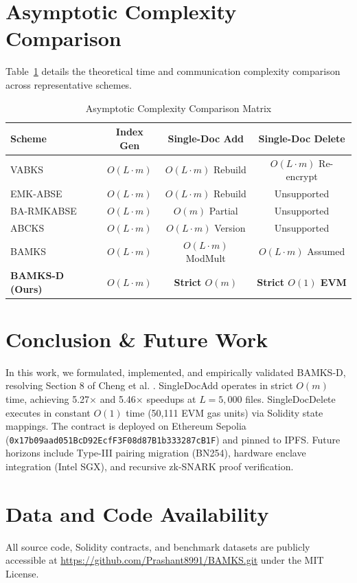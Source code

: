 \documentclass[journal,10pt,twocolumn]{IEEEtran}
\begin{document}
\section{Asymptotic Complexity Comparison}
Table~\ref{tab:asymptotic} details the theoretical time and communication complexity comparison across representative schemes.

\begin{table}[t]
\caption{Asymptotic Complexity Comparison Matrix}
\label{tab:asymptotic}
\centering
\begin{tabular}{lccc}
\toprule
\textbf{Scheme} & \textbf{Index Gen} & \textbf{Single-Doc Add} & \textbf{Single-Doc Delete} \\
\midrule
VABKS \cite{zheng2014vabks} & $O(L \cdot m)$ & $O(L \cdot m)$ Rebuild & $O(L \cdot m)$ Re-encrypt \\
EMK-ABSE \cite{liu2022emk} & $O(L \cdot m)$ & $O(L \cdot m)$ Rebuild & Unsupported \\
BA-RMKABSE \cite{su2022barmk} & $O(L \cdot m)$ & $O(m)$ Partial & Unsupported \\
ABCKS \cite{zhang2023abcks} & $O(L \cdot m)$ & $O(L \cdot m)$ Version & Unsupported \\
BAMKS \cite{cheng2026bamks} & $O(L \cdot m)$ & $O(L \cdot m)$ ModMult & $O(L \cdot m)$ Assumed \\
\textbf{BAMKS-D (Ours)} & $O(L \cdot m)$ & \textbf{Strict $O(m)$} & \textbf{Strict $O(1)$ EVM} \\
\bottomrule
\end{tabular}
\end{table}

\section{Conclusion \& Future Work}
In this work, we formulated, implemented, and empirically validated BAMKS-D, resolving Section 8 of Cheng et al. \cite{cheng2026bamks}. SingleDocAdd operates in strict $O(m)$ time, achieving 5.27$\times$ and 5.46$\times$ speedups at $L = 5,000$ files. SingleDocDelete executes in constant $O(1)$ time (50,111 EVM gas units) via Solidity state mappings. The contract is deployed on Ethereum Sepolia (\texttt{0x17b09aad051BcD92EcfF3F08d87B1b333287cB1F}) and pinned to IPFS. Future horizons include Type-III pairing migration (BN254), hardware enclave integration (Intel SGX), and recursive zk-SNARK proof verification.

\section*{Data and Code Availability}
All source code, Solidity contracts, and benchmark datasets are publicly accessible at \url{https://github.com/Prashant8991/BAMKS.git} under the MIT License.
\end{document}
